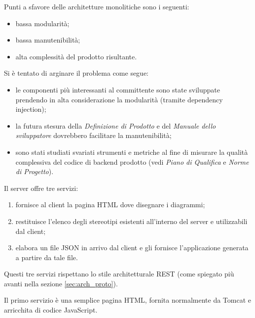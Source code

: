 Punti a sfavore delle architetture monolitiche sono i seguenti:
\begin{itemize}
\item bassa modularità;
\item bassa manutenibilità;
\item alta complessità del prodotto risultante.
\end{itemize}

Si è tentato di arginare il problema come segue:
\begin{itemize}
\item le componenti più interessanti al committente sono state sviluppate prendendo in alta considerazione la modularità (tramite dependency injection);
\item la futura stesura della \emph{Definizione di Prodotto} e del \emph{Manuale dello sviluppatore} dovrebbero facilitare la manutenibilità;
\item sono stati studiati svariati strumenti e metriche al fine di misurare la qualità complessiva del codice di backend prodotto (vedi \emph{Piano di Qualifica} e \emph{Norme di Progetto}).
\end{itemize}



Il server offre tre servizi:
\begin{enumerate}
	\item fornisce al client la pagina HTML dove disegnare i diagrammi;
	\item restituisce l'elenco degli stereotipi esistenti all'interno del server e utilizzabili dal client;
	\item elabora un file JSON in arrivo dal client e gli fornisce l'applicazione generata a partire da tale file.
\end{enumerate}
Questi tre servizi rispettano lo stile architetturale REST (come spiegato più avanti nella sezione \ref{sec:arch_proto}).

Il primo servizio è una semplice pagina HTML, fornita normalmente da Tomcat e arricchita di codice JavaScript.

